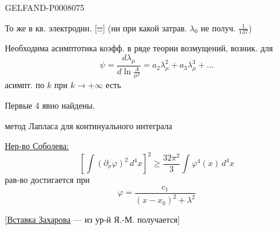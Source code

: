 \begin{GelfandAdjacentEvidence}{GELFAND-P000807}{5}


То же в кв. электродин. [\sout{\ldots}]
(ни при какой затрав. \(\lambda_0\) не получ. \(\frac{1}{137}\))
\end{GelfandAdjacentEvidence}


Необходима асимптотика коэфф. в ряде теории возмущений, возник. для
\[
\psi=\frac{d\lambda_\mu}{d\ln\frac{\Lambda}{\mu^2}}
=a_2\lambda_\mu^2+a_3\lambda_\mu^3+\ldots
\]
асимпт. по \(k\) при \(k\to+\infty\) есть

Первые 4 явно найдены.

 метод Лапласа для континуального интеграла

\uline{Нер-во Соболева:}
\[
\left[\int(\partial_\sigma\varphi)^2\,d^4x\right]^2
\geq\frac{32\pi^2}{3}\int\varphi^4(x)\,d^4x
\]
рав-во достигается при
\[
\varphi=\frac{c_1}{(x-x_0)^2+\lambda^2}
\]

[\underline{\underline{Вставка Захарова}}\quad
{}
--- из ур-й Я.-М. получается]


